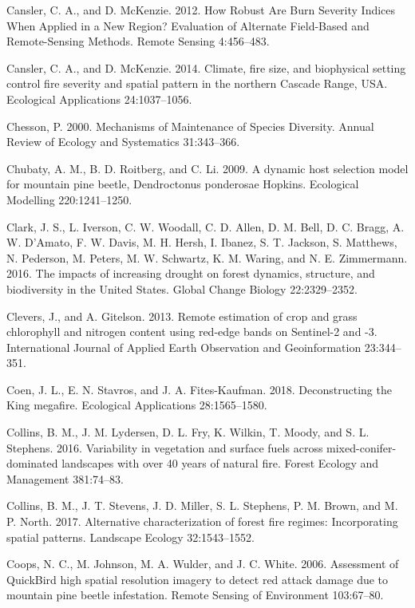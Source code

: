 \documentclass[twoside,12pt,final]{ucthesis-CA2012}
\begin{document}
\begin{ucmainmatter}
\hypertarget{ref-cansler2012}{}
Cansler, C. A., and D. McKenzie. 2012. How Robust Are Burn Severity
Indices When Applied in a New Region? Evaluation of Alternate
Field-Based and Remote-Sensing Methods. Remote Sensing 4:456--483.

\hypertarget{ref-cansler2014}{}
Cansler, C. A., and D. McKenzie. 2014. Climate, fire size, and
biophysical setting control fire severity and spatial pattern in the
northern Cascade Range, USA. Ecological Applications 24:1037--1056.

\hypertarget{ref-chesson2000}{}
Chesson, P. 2000. Mechanisms of Maintenance of Species Diversity. Annual
Review of Ecology and Systematics 31:343--366.

\hypertarget{ref-chubaty2009}{}
Chubaty, A. M., B. D. Roitberg, and C. Li. 2009. A dynamic host
selection model for mountain pine beetle, Dendroctonus ponderosae
Hopkins. Ecological Modelling 220:1241--1250.

\hypertarget{ref-clark2016}{}
Clark, J. S., L. Iverson, C. W. Woodall, C. D. Allen, D. M. Bell, D. C.
Bragg, A. W. D'Amato, F. W. Davis, M. H. Hersh, I. Ibanez, S. T.
Jackson, S. Matthews, N. Pederson, M. Peters, M. W. Schwartz, K. M.
Waring, and N. E. Zimmermann. 2016. The impacts of increasing drought on
forest dynamics, structure, and biodiversity in the United States.
Global Change Biology 22:2329--2352.

\hypertarget{ref-clevers2013}{}
Clevers, J., and A. Gitelson. 2013. Remote estimation of crop and grass
chlorophyll and nitrogen content using red-edge bands on Sentinel-2 and
-3. International Journal of Applied Earth Observation and
Geoinformation 23:344--351.

\hypertarget{ref-coen2018}{}
Coen, J. L., E. N. Stavros, and J. A. Fites-Kaufman. 2018.
Deconstructing the King megafire. Ecological Applications 28:1565--1580.

\hypertarget{ref-collins2016}{}
Collins, B. M., J. M. Lydersen, D. L. Fry, K. Wilkin, T. Moody, and S.
L. Stephens. 2016. Variability in vegetation and surface fuels across
mixed-conifer-dominated landscapes with over 40 years of natural fire.
Forest Ecology and Management 381:74--83.

\hypertarget{ref-collins2017}{}
Collins, B. M., J. T. Stevens, J. D. Miller, S. L. Stephens, P. M.
Brown, and M. P. North. 2017. Alternative characterization of forest
fire regimes: Incorporating spatial patterns. Landscape Ecology
32:1543--1552.

\hypertarget{ref-coops2006}{}
Coops, N. C., M. Johnson, M. A. Wulder, and J. C. White. 2006.
Assessment of QuickBird high spatial resolution imagery to detect red
attack damage due to mountain pine beetle infestation. Remote Sensing of
Environment 103:67--80.


\end{ucmainmatter}
\end{document}
